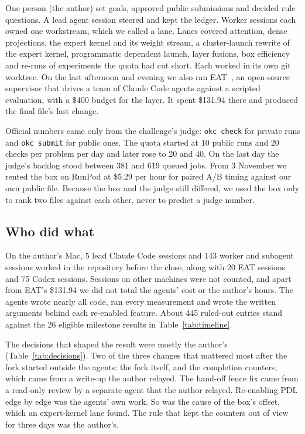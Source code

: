 \documentclass[11pt]{article}
\begin{document}
One person (the author) set goals, approved public submissions and decided rule
questions. A lead agent session steered and kept the ledger. Worker sessions each
owned one workstream, which we called a lane. Lanes covered attention, dense
projections, the expert kernel and its weight stream, a cluster-launch rewrite of
the expert kernel, programmatic dependent launch, layer fusions, box efficiency
and re-runs of experiments the quota had cut short.
Each worked in its own git worktree. On the last afternoon and evening we also
ran EAT~\cite{eat}, an open-source supervisor that drives a team of Claude Code
agents against a scripted evaluation, with a \$400 budget for the layer. It spent
\$131.94 there and
produced the final file's last change.

Official numbers came only from the challenge's judge: \texttt{okc check} for
private runs and \texttt{okc submit} for public ones. The quota started at 10
public runs and 20 checks per problem per day and later rose to 20 and 40. On the
last day the judge's backlog stood between 381 and 619 queued jobs. From 3 November we
rented the box on RunPod at \$5.29 per hour for paired A/B timing against our own
public file. Because the box and the judge still differed, we used the box only to
rank two files against each other, never to predict a judge number.

\subsection{Who did what}

On the author's Mac, 5 lead Claude Code sessions and 143 worker and subagent
sessions worked in the repository before the close, along with 20 EAT sessions
and 75 Codex sessions. Sessions on other machines were not counted, and apart from
EAT's \$131.94 we did not total the agents' cost or the author's hours. The agents
wrote nearly all code, ran every measurement and wrote the written arguments
behind each re-enabled feature. About 445 ruled-out entries stand against the 26
eligible milestone results in Table~\ref{tab:timeline}.

The decisions that shaped the result were mostly the author's
(Table~\ref{tab:decisions}). Two of the three changes that mattered most after the
fork started outside the agents: the fork itself, and the completion counters,
which came from a write-up the author relayed. The hand-off fence fix came from a
read-only review by a separate agent that the author relayed. Re-enabling PDL edge
by edge was the agents' own work. So was the cause of the box's offset, which an
expert-kernel lane found. The rule that kept the counters out of view for three
days was the author's.
\end{document}
